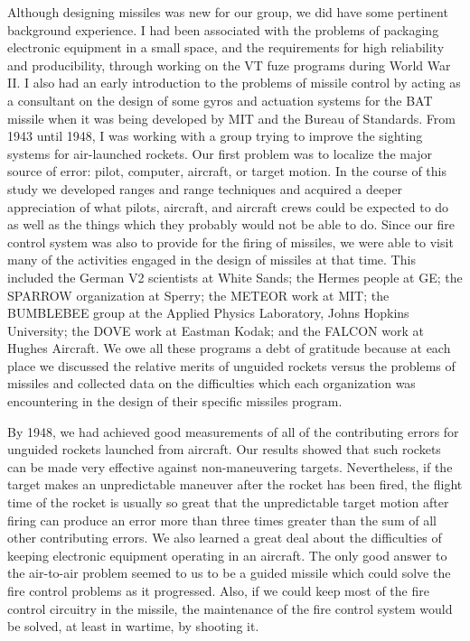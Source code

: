 \documentclass{memoir}
\begin{document}
Although designing missiles was new for our group, we did have some pertinent background experience. I had been associated with the problems of packaging electronic equipment in a small space, and the requirements for high reliability and producibility, through working on the VT fuze programs during World War II. I also had an early introduction to the problems of missile control by acting as a consultant on the design of some gyros and actuation systems for the BAT missile when it was being developed by MIT and the Bureau of Standards. From 1943 until 1948, I was working with a group trying to improve the sighting systems for air-launched rockets. Our first problem was to localize the major source of error: pilot, computer, aircraft, or target motion. In the course of this study we developed ranges and range techniques and acquired a deeper appreciation of what pilots, aircraft, and aircraft crews could be expected to do as well as the things which they probably would not be able to do. Since our fire control system was also to provide for the firing of missiles, we were able to visit many of the activities engaged in the design of missiles at that time. This included the German V2 scientists at White Sands; the Hermes people at GE; the SPARROW organization at Sperry; the METEOR work at MIT; the BUMBLEBEE group at the Applied Physics Laboratory, Johns Hopkins University; the DOVE work at Eastman Kodak; and the FALCON work at Hughes Aircraft. We owe all these programs a debt of gratitude because at each place we discussed the relative merits of unguided rockets versus the problems of missiles and collected data on the difficulties which each organization was encountering in the design of their specific missiles program.

By 1948, we had achieved good measurements of all of the contributing errors for unguided rockets launched from aircraft. Our results showed that such rockets can be made very effective against non-maneuvering targets. Nevertheless, if the target makes an unpredictable maneuver after the rocket has been fired, the flight time of the rocket is usually so great that the unpredictable target motion after firing can produce an error more than three times greater than the sum of all other contributing errors. We also learned a great deal about the difficulties of keeping electronic equipment operating in an aircraft. The only good answer to the air-to-air problem seemed to us to be a guided missile which could solve the fire control problems as it progressed. Also, if we could keep most of the fire control circuitry in the missile, the maintenance of the fire control system would be solved, at least in wartime, by shooting it.
\end{document}

